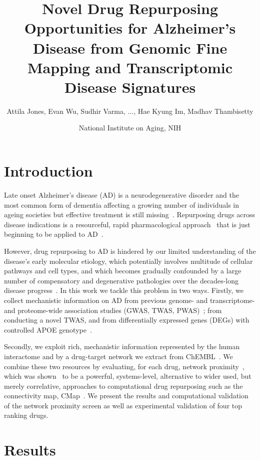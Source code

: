 \documentclass[letterpaper]{article}
\title{Novel Drug Repurposing Opportunities for Alzheimer's Disease from
  Genomic Fine Mapping and Transcriptomic Disease Signatures}
\author{Attila Jones, Evan Wu, Sudhir Varma, ..., Hae Kyung Im, Madhav Thambisetty}
\date{National Institute on Aging, NIH}
\begin{document}
\maketitle

\section{Introduction}

Late onset Alzheimer's disease (AD) is a neurodegenerative disorder and the most
common form of dementia affecting a growing number of individuals in ageing
societies but effective treatment is still
missing~\citep{Bondi2017,Masters2015}.  Repurposing drugs across disease
indications is a resourceful, rapid pharmacological
approach~\citep{Pushpakom2019} that is just beginning to be applied to
AD~\citep{Fang2021,Taubes2021}.

However, drug repurposing to AD is hindered by our limited understanding of
the disease's early molecular etiology, which potentially involves multitude
of cellular pathways and cell types, and which becomes gradually confounded by
a large number of compensatory and degenerative pathologies over the
decades-long disease progress~\citep{DeStrooper2016}.  In this work we tackle
this problem in two ways.  Firstly, we collect mechanistic information on AD from previous genome-
and transcriptome- and proteome-wide association studies (GWAS, TWAS,
PWAS)~\citep{Jansen2019,Kunkle2019,Gerring2020,Baird2021,Schwartzentruber2021,Wightman2021,Wingo2021};
from conducting a novel TWAS, and from differentially expressed genes (DEGs)
with controlled APOE genotype~\citep{Taubes2021,Lin2018}.

Secondly, we exploit rich, mechanistic information represented by the human
interactome and by a drug-target network we extract from
ChEMBL~\citep{Gaulton2017}.  We combine these two resources by evaluating, for
each drug, network proximity~\citep{Guney2016}, which was
shown~\citep{Cheng2018} to be a powerful, systems-level, alternative to wider
used, but merely correlative, approaches to computational drug repurposing
such as the connectivity map, CMap~\citep{Lamb2006}.  We present the results
and computational validation of the network proximity screen as well as
experimental validation of four top ranking drugs.

\section{Results}
\end{document}
